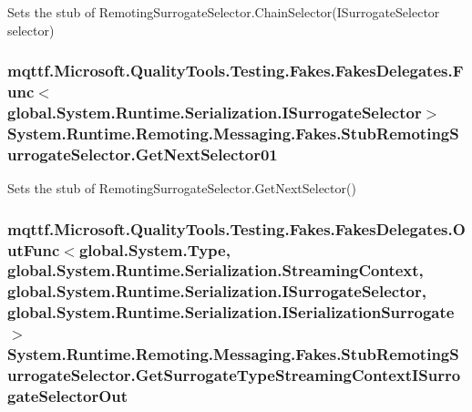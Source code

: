 Sets the stub of Remoting\-Surrogate\-Selector.\-Chain\-Selector(\-I\-Surrogate\-Selector selector)

\hypertarget{class_system_1_1_runtime_1_1_remoting_1_1_messaging_1_1_fakes_1_1_stub_remoting_surrogate_selector_a39b62aa6e07250c70be2f93cca31d165}{
\subsubsection[{Get\-Next\-Selector01}]{\setlength{\rightskip}{0pt plus 5cm}mqttf.\-Microsoft.\-Quality\-Tools.\-Testing.\-Fakes.\-Fakes\-Delegates.\-Func$<$global.\-System.\-Runtime.\-Serialization.\-I\-Surrogate\-Selector$>$ System.\-Runtime.\-Remoting.\-Messaging.\-Fakes.\-Stub\-Remoting\-Surrogate\-Selector.\-Get\-Next\-Selector01}}\label{class_system_1_1_runtime_1_1_remoting_1_1_messaging_1_1_fakes_1_1_stub_remoting_surrogate_selector_a39b62aa6e07250c70be2f93cca31d165}


Sets the stub of Remoting\-Surrogate\-Selector.\-Get\-Next\-Selector()

\hypertarget{class_system_1_1_runtime_1_1_remoting_1_1_messaging_1_1_fakes_1_1_stub_remoting_surrogate_selector_a9a7c9d456f8f1ace540750b3f3474fba}{
\subsubsection[{Get\-Surrogate\-Type\-Streaming\-Context\-I\-Surrogate\-Selector\-Out}]{\setlength{\rightskip}{0pt plus 5cm}mqttf.\-Microsoft.\-Quality\-Tools.\-Testing.\-Fakes.\-Fakes\-Delegates.\-Out\-Func$<$global.\-System.\-Type, global.\-System.\-Runtime.\-Serialization.\-Streaming\-Context, global.\-System.\-Runtime.\-Serialization.\-I\-Surrogate\-Selector, global.\-System.\-Runtime.\-Serialization.\-I\-Serialization\-Surrogate$>$ System.\-Runtime.\-Remoting.\-Messaging.\-Fakes.\-Stub\-Remoting\-Surrogate\-Selector.\-Get\-Surrogate\-Type\-Streaming\-Context\-I\-Surrogate\-Selector\-Out}}\label{class_system_1_1_runtime_1_1_remoting_1_1_messaging_1_1_fakes_1_1_stub_remoting_surrogate_selector_a9a7c9d456f8f1ace540750b3f3474fba}


